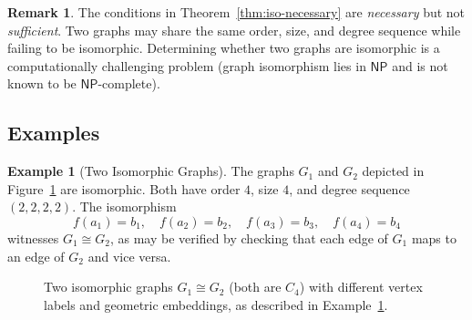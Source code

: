 \documentclass[12pt,a4paper]{article}
\theoremstyle{definition}
\newtheorem{example}{Example}[section]
\newtheorem{remark}{Remark}[section]
\theoremstyle{plain}
\begin{document}
\begin{remark}\label{rem:sufficient}
  The conditions in Theorem~\ref{thm:iso-necessary} are \emph{necessary}
  but not \emph{sufficient}.  Two graphs may share the same order, size,
  and degree sequence while failing to be isomorphic.  Determining whether
  two graphs are isomorphic is a computationally challenging problem (graph
  isomorphism lies in \(\mathsf{NP}\) and is not known to be
  \(\mathsf{NP}\)-complete).
\end{remark}

\subsection{Examples}

\begin{example}[Two Isomorphic Graphs]\label{ex:iso}
  The graphs \(G_1\) and \(G_2\) depicted in Figure~\ref{fig:isomorphic}
  are isomorphic.  Both have order \(4\), size \(4\), and degree sequence
  \((2,2,2,2)\).  The isomorphism
  \begin{equation}
    f(a_1)=b_1,\quad f(a_2)=b_2,\quad f(a_3)=b_3,\quad f(a_4)=b_4
    \label{eq:iso-map}
  \end{equation}
  witnesses \(G_1 \cong G_2\), as may be verified by checking that each
  edge of \(G_1\) maps to an edge of \(G_2\) and vice versa.
\end{example}

\begin{figure}[htbp]
  \centering
  \caption{Two isomorphic graphs \(G_1 \cong G_2\) (both are \(C_4\)) with
           different vertex labels and geometric embeddings, as described in
           Example~\ref{ex:iso}.}
  \label{fig:isomorphic}
\end{figure}
\end{document}
